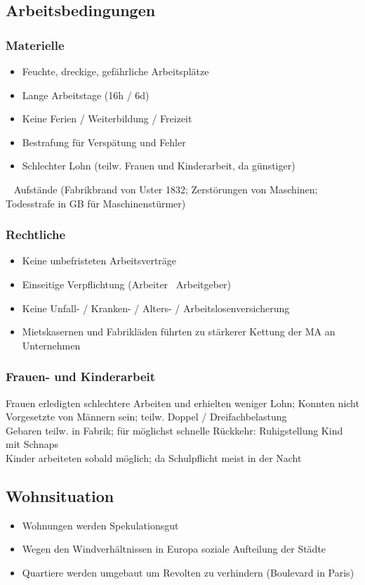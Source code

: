 \documentclass{report}
\begin{document}
\subsection{Arbeitsbedingungen}
\subsubsection{Materielle}
\begin{itemize}
	\item Feuchte, dreckige, gefährliche Arbeitsplätze
	\item Lange Arbeitstage (16h / 6d)
	\item Keine Ferien / Weiterbildung / Freizeit
	\item Bestrafung für Verspätung und Fehler
	\item Schlechter Lohn (teilw. Frauen und Kinderarbeit, da günstiger)
\end{itemize}
\arrow~ Aufstände (Fabrikbrand von Uster 1832; Zerstörungen von Maschinen; Todesstrafe in GB für Maschinenstürmer)

\subsubsection{Rechtliche}
\begin{itemize}
	\item Keine unbefristeten Arbeitsverträge
	\item Einseitige Verpflichtung (Arbeiter \arrow~Arbeitgeber)
	\item Keine Unfall- / Kranken- / Alters- / Arbeitslosenversicherung
	\item Mietskasernen und Fabrikläden führten zu stärkerer Kettung der MA an Unternehmen
\end{itemize}

\subsubsection{Frauen- und Kinderarbeit}
Frauen erledigten schlechtere Arbeiten und erhielten weniger Lohn; Konnten nicht Vorgesetzte von Männern sein; teilw. Doppel / Dreifachbelastung\\
Gebaren teilw. in Fabrik; für möglichst schnelle Rückkehr: Ruhigstellung Kind mit Schnaps\\
Kinder arbeiteten sobald möglich; da Schulpflicht meist in der Nacht

\subsection{Wohnsituation}
\begin{itemize}
	\item Wohnungen werden Spekulationsgut
	\item Wegen den Windverhältnissen in Europa soziale Aufteilung der Städte
	\item Quartiere werden umgebaut um Revolten zu verhindern (Boulevard in Paris)
\end{itemize}
\end{document}

